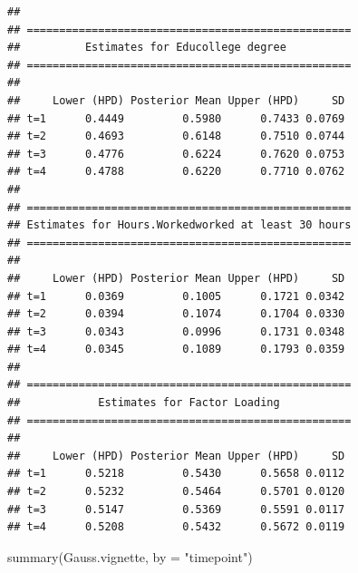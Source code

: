 \documentclass[a4paper, preprint, 3p,
authoryear]{elsarticle} %
\newenvironment{Shaded}{\begin{snugshade}}{\end{snugshade}}
\newcommand{\NormalTok}[1]{#1}
\begin{document}
\begin{verbatim}
## 
## ==================================================
##          Estimates for Educollege degree
## ==================================================
## 
##     Lower (HPD) Posterior Mean Upper (HPD)     SD
## t=1      0.4449         0.5980      0.7433 0.0769
## t=2      0.4693         0.6148      0.7510 0.0744
## t=3      0.4776         0.6224      0.7620 0.0753
## t=4      0.4788         0.6220      0.7710 0.0762
## 
## ==================================================
## Estimates for Hours.Workedworked at least 30 hours
## ==================================================
## 
##     Lower (HPD) Posterior Mean Upper (HPD)     SD
## t=1      0.0369         0.1005      0.1721 0.0342
## t=2      0.0394         0.1074      0.1704 0.0330
## t=3      0.0343         0.0996      0.1731 0.0348
## t=4      0.0345         0.1089      0.1793 0.0359
## 
## ==================================================
##            Estimates for Factor Loading
## ==================================================
## 
##     Lower (HPD) Posterior Mean Upper (HPD)     SD
## t=1      0.5218         0.5430      0.5658 0.0112
## t=2      0.5232         0.5464      0.5701 0.0120
## t=3      0.5147         0.5369      0.5591 0.0117
## t=4      0.5208         0.5432      0.5672 0.0119
\end{verbatim}

\begin{Shaded}
\begin{Highlighting}[]
\NormalTok{summary(Gauss.vignette, by = "timepoint")}
\end{Highlighting}
\end{Shaded}
\end{document}
